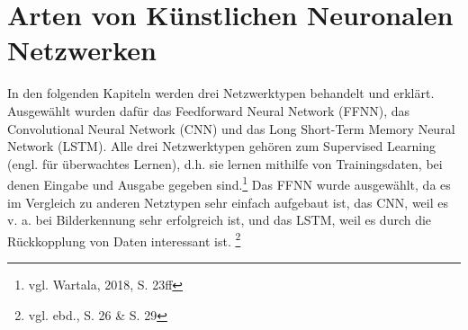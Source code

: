 \documentclass[
	a4paper,
	12pt,
	ngerman,
	oneside
]{scrreprt}											%
\begin{document}
		\section{Arten von Künstlichen Neuronalen Netzwerken}\label{Arten}
			In den folgenden Kapiteln werden drei Netzwerktypen behandelt und erklärt. Ausgewählt wurden dafür das Feedforward Neural Network (FFNN), das Convolutional Neural Network (CNN) und das Long Short-Term Memory Neural Network (LSTM). Alle drei Netzwerktypen gehören zum Supervised Learning (engl. für überwachtes Lernen), d.h. sie lernen mithilfe von Trainingsdaten, bei denen Eingabe und Ausgabe gegeben sind.\footnote{vgl. Wartala, 2018, S. 23ff} Das FFNN wurde ausgewählt, da es im Vergleich zu anderen Netztypen sehr einfach aufgebaut ist, das CNN, weil es v. a. bei Bilderkennung sehr erfolgreich ist, und das LSTM, weil es durch die Rückkopplung von Daten interessant ist. \footnote{vgl. ebd., S. 26 \& S. 29}
			
			
\end{document}
